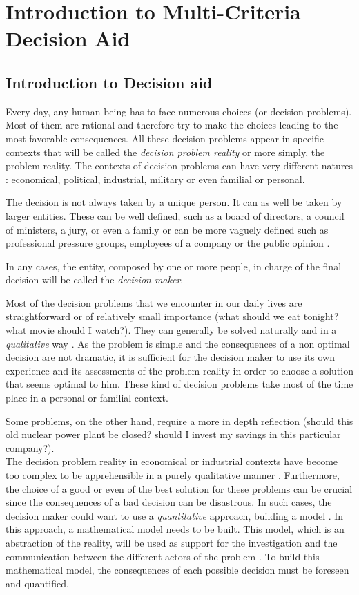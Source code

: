 \chapter{Introduction to Multi-Criteria Decision Aid}
\label{chap:mcda}

\section{Introduction to Decision aid} \label{sec:intro}

Every day, any human being has to face numerous choices (or decision problems).
Most of them are rational and therefore try to make the choices leading to the most favorable consequences.
All these decision problems appear in specific contexts that will be called the \textit{decision problem reality} or more simply, the problem reality. The contexts of decision problems can have very different natures \cite{Bertrand2002}\cite{roy1book85}: economical, political, industrial, military or even familial or personal.

The decision is not always taken by a unique person.
It can as well be taken by larger entities. These can be well defined, such as a board of directors, a council of ministers, a jury, or even a family or can be more vaguely defined such as professional pressure groups, employees of a company or the public opinion \cite{roy1book85}.

In any cases, the entity, composed by one or more people, in charge of the final decision will be called the \textit{decision maker}.

Most of the decision problems that we encounter in our daily lives are straightforward or of relatively small importance (what should we eat tonight? what movie should I watch?). They can generally be solved naturally and in a \textit{qualitative} way \cite{Bertrand2002}.
As the problem is simple and the consequences of a non optimal decision are not dramatic, it is sufficient for the decision maker to use its own experience and its assessments of the problem reality in order to choose a solution that seems optimal to him.
These kind of decision problems take most of the time place in a personal or familial context.

Some problems, on the other hand, require a more in depth reflection (should this old nuclear power plant be closed? should I invest my savings in this particular company?). \\
The decision problem reality in economical or industrial contexts have become too complex to be apprehensible in a purely qualitative manner \cite{Bertrand2002}.
Furthermore, the  choice of a good or even of the best solution for these problems can be crucial since the consequences of a bad decision can be disastrous.
In such cases, the decision maker could want to use a \textit{quantitative} approach, building a model \cite{Bertrand2002} \cite{DeSmet2013}.
In this approach, a mathematical model needs to be built. This model, which is an abstraction of the reality, will be used as support for the investigation and the communication between the different actors of the problem \cite{DeSmet2013} \cite{roy1book85}. To build this mathematical model, the consequences of each possible decision must be foreseen and quantified.

